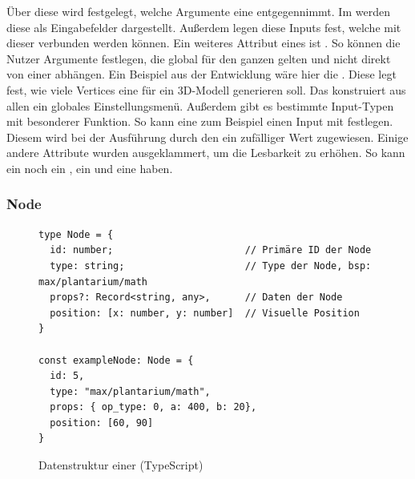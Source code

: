 \documentclass[ngerman]{article}
\begin{document}
Über diese  wird festgelegt, welche Argumente eine  entgegennimmt.
Im  werden diese als Eingabefelder dargestellt. Außerdem legen diese Inputs fest,  welche  mit dieser  verbunden werden können. 
\br
Ein weiteres Attribut eines  ist . So können die Nutzer Argumente festlegen, die global für den ganzen  gelten und nicht direkt von einer  abhängen. Ein Beispiel aus der Entwicklung wäre hier die . Diese legt fest, wie viele Vertices eine  für ein 3D-Modell generieren soll. Das  konstruiert aus allen  ein globales Einstellungsmenü.
\br
Außerdem gibt es bestimmte Input-Typen mit besonderer Funktion. So kann eine  zum Beispiel einen Input mit  festlegen. Diesem wird bei der Ausführung durch den  ein zufälliger Wert zugewiesen.
\br
Einige andere Attribute wurden ausgeklammert, um die Lesbarkeit zu erhöhen. So kann ein  noch ein , ein  und eine  haben.

\subsubsection*{Node}

\begin{figure}[htbp]
  \begin{code}
    \begin{verbatim}
type Node = {
  id: number;                       // Primäre ID der Node
  type: string;                     // Type der Node, bsp: max/plantarium/math
  props?: Record<string, any>,      // Daten der Node
  position: [x: number, y: number]  // Visuelle Position
}

const exampleNode: Node = {
  id: 5,
  type: "max/plantarium/math",
  props: { op_type: 0, a: 400, b: 20},
  position: [60, 90]
}

    \end{verbatim}
  \end{code}

  \caption{Datenstruktur einer  (TypeScript)}
  \label{fig:data_node}

\end{figure}
\end{document}
